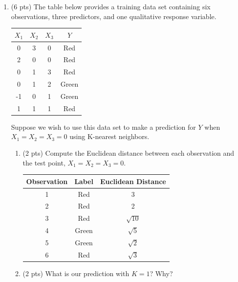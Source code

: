 \documentclass[a4paper]{article}
\theoremstyle{definition}
\newenvironment{soln}{
    \leavevmode\color{blue}\ignorespaces
}{}
\begin{document}
\begin{enumerate}
\begin{enumerate}
\end{enumerate}

\item (6 pts) The table below provides a training data set containing six observations, three predictors, and one qualitative response variable.

\begin{center}
	\begin{tabular}{ c  c  c  c}
		\hline
		$X_{1}$ & $X_{2}$ & $X_{3}$ & $Y$ \\ \hline
		0 & 3 & 0 & Red \\
		2 & 0 & 0 & Red \\
		0 & 1 & 3 & Red \\
		0 & 1 & 2 & Green \\
		-1 & 0 & 1 & Green \\
		1 & 1 & 1 & Red  \\
		\hline
	\end{tabular}
\end{center}

Suppose we wish to use this data set to make a prediction for $Y$ when $X_{1} = X_{2} = X_{3} = 0$ using K-nearest neighbors.

\begin{enumerate}
	\item (2 pts) Compute the Euclidean distance between each observation and the test point, $X_{1} = X_{2} = X_{3}=0$.
 
	\begin{soln}
            \begin{center}
            	\begin{tabular}{| c | c | c |}
            		\hline
            		Observation & Label & Euclidean Distance \\
            		\hline 1 & Red & 3\\
            		\hline 2 & Red & 2\\
            		\hline 3 & Red & $\sqrt{10}$ \\
            		\hline 4 & Green & $\sqrt{5}$\\
            		\hline 5 & Green & $\sqrt{2}$\\
            		\hline 6 & Red & $\sqrt{3}$ \\
            		\hline
            	\end{tabular}
            \end{center}
        \end{soln}
 
	\item (2 pts) What is our prediction with $K=1$? Why?
	

\end{enumerate}
\end{enumerate}
\end{document}
